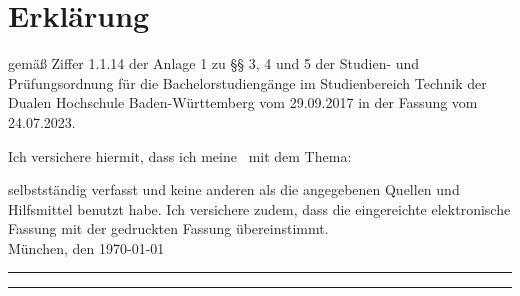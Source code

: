 %
%
%
%

\chapter*{Erklärung} %

gemäß Ziffer 1.1.14 der Anlage 1 zu §§ 3, 4 und 5  der Studien- und Prüfungsordnung für die Bachelorstudiengänge im Studienbereich Technik der Dualen Hochschule Baden-Württemberg vom 29.09.2017 in der Fassung vom 24.07.2023.

Ich versichere hiermit, dass ich meine \arbeit\ mit dem Thema:

\begin{quote}
	\textit{\titel} %
\end{quote}

selbstständig verfasst und keine anderen als die angegebenen Quellen und Hilfsmittel benutzt habe. Ich versichere zudem, dass die eingereichte elektronische Fassung mit der gedruckten Fassung übereinstimmt.\\[6ex]

München, den \today \\[1ex]

\rule[-0.2cm]{5cm}{0.5pt}  \rule[-0.2cm]{5cm}{0.5pt}  \\

\autor \\[10ex]

\rmfamily

\thispagestyle{empty}

